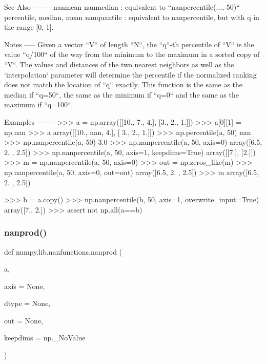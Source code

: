 \begin{DoxyVerb}
See Also
--------
nanmean
nanmedian : equivalent to ``nanpercentile(..., 50)``
percentile, median, mean
nanquantile : equivalent to nanpercentile, but with q in the range [0, 1].

Notes
-----
Given a vector ``V`` of length ``N``, the ``q``-th percentile of
``V`` is the value ``q/100`` of the way from the minimum to the
maximum in a sorted copy of ``V``. The values and distances of
the two nearest neighbors as well as the `interpolation` parameter
will determine the percentile if the normalized ranking does not
match the location of ``q`` exactly. This function is the same as
the median if ``q=50``, the same as the minimum if ``q=0`` and the
same as the maximum if ``q=100``.

Examples
--------
>>> a = np.array([[10., 7., 4.], [3., 2., 1.]])
>>> a[0][1] = np.nan
>>> a
array([[10.,  nan,   4.],
      [ 3.,   2.,   1.]])
>>> np.percentile(a, 50)
nan
>>> np.nanpercentile(a, 50)
3.0
>>> np.nanpercentile(a, 50, axis=0)
array([6.5, 2. , 2.5])
>>> np.nanpercentile(a, 50, axis=1, keepdims=True)
array([[7.],
       [2.]])
>>> m = np.nanpercentile(a, 50, axis=0)
>>> out = np.zeros_like(m)
>>> np.nanpercentile(a, 50, axis=0, out=out)
array([6.5, 2. , 2.5])
>>> m
array([6.5,  2. ,  2.5])

>>> b = a.copy()
>>> np.nanpercentile(b, 50, axis=1, overwrite_input=True)
array([7., 2.])
>>> assert not np.all(a==b)\end{DoxyVerb}
 \mbox{\label{namespacenumpy_1_1lib_1_1nanfunctions_a7c5e7f7084f8d2535e4506776ac0c98f}} 
\subsubsection{\texorpdfstring{nanprod()}{nanprod()}}
{\footnotesize\ttfamily def numpy.\+lib.\+nanfunctions.\+nanprod (\begin{DoxyParamCaption}\item[{}]{a,  }\item[{}]{axis = {\ttfamily None},  }\item[{}]{dtype = {\ttfamily None},  }\item[{}]{out = {\ttfamily None},  }\item[{}]{keepdims = {\ttfamily np.\+\_\+NoValue} }\end{DoxyParamCaption})}

